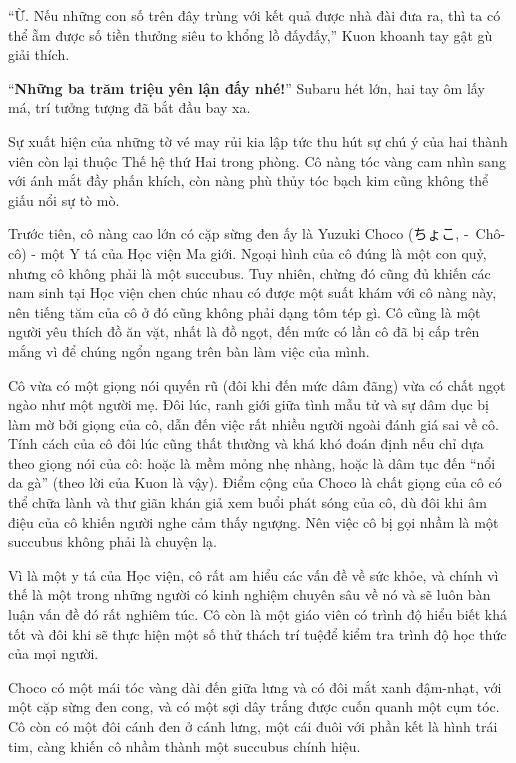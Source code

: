 \documentclass[../main.tex]{subfiles}
\begin{document}

``Ừ. Nếu những con số trên đây trùng với kết quả được nhà đài đưa ra, thì ta có thể ẵm được số tiền thưởng siêu to khổng lồ đấyđấy,'' Kuon khoanh tay gật gù giải thích.

``\textbf{Những ba trăm triệu yên lận đấy nhé!}'' Subaru hét lớn, hai tay ôm lấy má, trí tưởng tượng đã bắt đầu bay xa.

Sự xuất hiện của những tờ vé may rủi kia lập tức thu hút sự chú ý của hai thành viên còn lại thuộc Thế hệ thứ Hai trong phòng. Cô nàng tóc vàng cam nhìn sang với ánh mắt đầy phấn khích, còn nàng phù thủy tóc bạch kim cũng không thể giấu nổi sự tò mò.

\chrint

Trước tiên, cô nàng cao lớn có cặp sừng đen ấy là Yuzuki Choco (ちょこ, -\ Chô-cô) - một Y tá của Học viện Ma giới. Ngoại hình của cô đúng là một con quỷ, nhưng cô không phải là một succubus. Tuy nhiên, chừng đó cũng đủ khiến các nam sinh tại Học viện chen chúc nhau có được một suất khám với cô nàng này, nên tiếng tăm của cô ở đó cũng không phải dạng tôm tép gì. Cô cũng là một người yêu thích đồ ăn vặt, nhất là đồ ngọt, đến mức có lần cô đã bị cấp trên mắng vì để chúng ngổn ngang trên bàn làm việc của mình.

Cô vừa có một giọng nói quyến rũ (đôi khi đến mức dâm đãng) vừa có chất ngọt ngào như một người mẹ. Đôi lúc, ranh giới giữa tình mẫu tử và sự dâm dục bị làm mờ bởi giọng của cô, dẫn đến việc rất nhiều người ngoài đánh giá sai về cô. Tính cách của cô đôi lúc cũng thất thường và khá khó đoán định nếu chỉ dựa theo giọng nói của cô: hoặc là mềm mỏng nhẹ nhàng, hoặc là dâm tục đến ``nổi da gà'' (theo lời của Kuon là vậy). Điểm cộng của Choco là chất giọng của cô có thể chữa lành và thư giãn khán giả xem buổi phát sóng của cô, dù đôi khi âm điệu của cô khiến người nghe cảm thấy ngượng. Nên việc cô bị gọi nhầm là một succubus không phải là chuyện lạ.

Vì là một y tá của Học viện, cô rất am hiểu các vấn đề về sức khỏe, và chính vì thế là một trong những người có kinh nghiệm chuyên sâu về nó và sẽ luôn bàn luận vấn đề đó rất nghiêm túc. Cô còn là một giáo viên có trình độ hiểu biết khá tốt và đôi khi sẽ thực hiện một số thử thách trí tuệđể kiểm tra trình độ học thức của mọi người.

Choco có một mái tóc vàng dài đến giữa lưng và có đôi mắt xanh đậm-nhạt, với một cặp sừng đen cong, và có một sợi dây trắng được cuốn quanh một cụm tóc. Cô còn có một đôi cánh đen ở cánh lưng, một cái đuôi với phần kết là hình trái tim, càng khiến cô nhầm thành một succubus chính hiệu.
\end{document}
